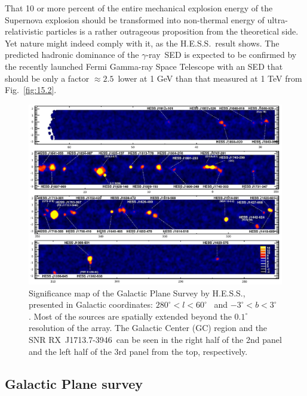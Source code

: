 \documentclass{svjour3x}                     %
\newcommand{\gr}{$\gamma$-ray}
\newcommand{\rxj}{RX~J1713.7-3946}
\newcommand{\hess}{H.E.S.S.}
\begin{document}
That 10 or more percent of the entire mechanical explosion energy of the
Supernova explosion should be transformed into non-thermal energy of
ultra-relativistic particles is a rather outrageous proposition from the
theoretical side. Yet nature might indeed comply with it, as the \hess\ result
shows. The predicted hadronic dominance of the \gr\ SED is expected to be
confirmed by the recently launched Fermi Gamma-ray Space Telescope with an SED
that should be only a factor $\approx 2.5$~lower at 1 GeV than that measured at
1 TeV from Fig.~\ref{fig:15.2}.

\begin{figure}[htb]
  \includegraphics[width=\textwidth]{GalacticScan_x.eps}
  \caption[Galactic Plane Survey by \hess]{Significance map of the Galactic
    Plane Survey by \hess, presented in Galactic coordinates: $280^{\circ} < l
    < 60^{\circ}$~ and $-3^{\circ} < b < 3^{\circ}$ \cite{galscan07}. Most of
    the sources are spatially extended beyond the $0.1^{\circ}$ resolution of
    the array. The Galactic Center (GC) region and the SNR \rxj\ can be seen in
    the right half of the 2nd panel and the left half of the 3rd panel from the
    top, respectively.}
  \label{fig:17}       %
\end{figure}

\subsection{Galactic Plane survey}
\end{document}

